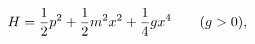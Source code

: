 \begin{equation}
H={1\over2}p^2+{1\over2}m^2x^2+{1\over4}gx^4\qquad(g>0),
\label{e29}
\end{equation}

